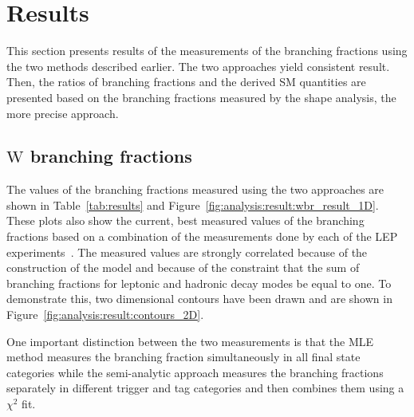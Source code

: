 \section{Results}
\label{sec:analysis:result}


This section presents results of the measurements of the branching
fractions using the two methods described earlier. 
The two approaches yield consistent result.
Then, the ratios of branching
fractions and the derived SM quantities are presented based on the branching
fractions measured by the shape analysis, the more precise approach.


\subsection{$\mathrm{W}$ branching fractions}
\label{sec:analysis:result:BWl}
The values of the
branching fractions measured using the two approaches are shown in
Table~\ref{tab:results} and Figure~\ref{fig:analysis:result:wbr_result_1D}.  These plots
also show the current, best measured values of the \PW branching fractions
based on a combination of the measurements done by each of the LEP
experiments~\cite{Schael:2013ita}.  The measured values are strongly
correlated because of the construction of the model and because of the
constraint that the sum of branching fractions for leptonic and hadronic
decay modes be equal to one.  To demonstrate this, two dimensional
contours have been drawn and are shown in Figure~\ref{fig:analysis:result:contours_2D}.

One important distinction between the two measurements is that the MLE
method measures the branching fraction simultaneously in all final state
categories while the semi-analytic approach measures the branching fractions
separately in different trigger and \PQb tag categories and then combines
them using a $\chi^{2}$ fit.  

